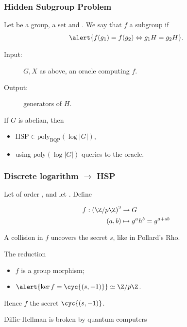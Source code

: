 \documentclass{beamer}
\renewcommand{\emph}[1]{}
\begin{document}

\begin{frame}
  \frametitle{Hidden Subgroup Problem}
  
  Let \emph{$G$} be a group, \emph{$X$} a set and \emph{$f:G\to X$}.
  We say that $f$ \emph{hides} a subgroup \emph{$H\subset G$} if
  \[\alert{f(g_1) = f(g_2) \Leftrightarrow g_1H = g_2H}.\]

  \begin{definition}
    \begin{description}
    \item[Input:] $G,X$ as above,  an oracle computing $f$.
    \item[Output:] generators of $H$.
    \end{description}
  \end{definition}

  \begin{theorem}
    If $G$ is abelian, then
    \begin{itemize}
    \item \alert{$\text{HSP}\in\text{poly}_\text{BQP}(\log|G|)$},
    \item using \alert{$\text{poly}(\log|G|)$} queries to the oracle.
    \end{itemize}
  \end{theorem}
\end{frame}


\begin{frame}
  \frametitle{Discrete logarithm $\to$ HSP}

  Let \emph{$G=\cyc{g}$} of order \emph{$p$}, and let
  \emph{$h=g^s$}. Define

  \begin{equation*}
    \begin{aligned}
      f : (\Z/p\Z)^2 &\to G\\
      (a,b) &\mapsto g^ah^b = g^{a+sb}
    \end{aligned}
  \end{equation*}

  \emph{Remark:} A collision in $f$ uncovers the secret $s$, like in
  Pollard's Rho.

  \begin{block}{The reduction}
    \begin{itemize}
    \item $f$ is a group morphism;
    \item $\alert{\ker f = \cyc{(s,-1)}} \simeq \Z/p\Z$.
    \end{itemize}
    Hence $f$ \emph{hides} the secret $\cyc{(s,-1)}$.
  \end{block}

  \emph{Consequence:} Diffie-Hellman is broken by quantum computers
\end{frame}
\end{document}
